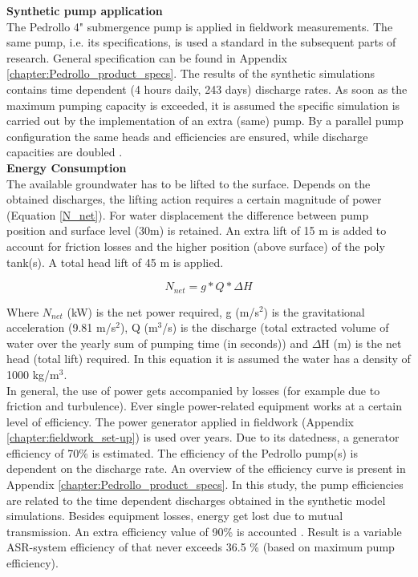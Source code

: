 \textbf{Synthetic pump application} \\
The Pedrollo 4" submergence pump is applied in fieldwork measurements. The same pump, i.e. its specifications, is used a standard in the subsequent parts of research. General specification can be found in Appendix \ref{chapter:Pedrollo_product_specs}. The results of the synthetic simulations contains time dependent (4 hours daily, 243 days) discharge rates. As soon as the maximum pumping capacity is exceeded, it is assumed the specific simulation is carried out by the implementation of an extra (same) pump. By a parallel pump configuration the same heads and efficiencies are ensured, while discharge capacities are doubled \citep{VandeGiesen2013}. \\ 

\textbf{Energy Consumption} \\
The available groundwater has to be lifted to the surface. Depends on the obtained discharges, the lifting action requires a certain magnitude of power (Equation \ref{N_net}). For water displacement the difference between pump position and surface level (30m) is retained. An extra lift of 15 m is added to account for friction losses and the higher position (above surface) of the poly tank(s). A total head lift of 45 m is applied.

\begin{equation}
N_{net} =  g * Q * \Delta H
\label{N_net}
\end{equation}

Where $N_{net}$ (kW) is the net power required, g (m/s$^2$) is the gravitational acceleration (9.81 m/s$^2$), Q (m$^3$/s) is the discharge (total extracted volume of water over the yearly sum of pumping time (in seconds)) and $\Delta$H (m) is the net head (total lift) required. In this equation it is assumed the water has a density of 1000 kg/m$^3$. \\

In general, the use of power gets accompanied by losses (for example due to friction and turbulence). Ever single power-related equipment works at a certain level of efficiency. The power generator applied in fieldwork (Appendix \ref{chapter:fieldwork_set-up}) is used over years. Due to its datedness, a generator efficiency of 70\% is estimated. The efficiency of the Pedrollo pump(s) is dependent on the discharge rate. An overview of the efficiency curve is present in Appendix \ref{chapter:Pedrollo_product_specs}. In this study, the pump efficiencies are related to the time dependent discharges obtained in the synthetic model simulations. Besides equipment losses, energy get lost due to mutual transmission. An extra efficiency value of 90\% is accounted \citep{VandeGiesen2013}. Result is a variable ASR-system efficiency of that never exceeds 36.5 \% (based on maximum pump efficiency).

